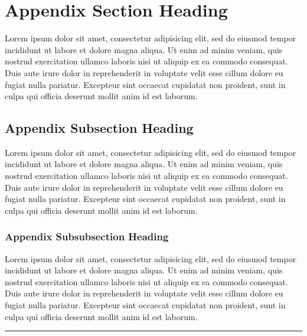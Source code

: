 \documentclass[11pt]{penrose}
\begin{document}
\appendix


\section{Appendix Section Heading}
Lorem ipsum dolor sit amet, consectetur adipisicing elit, sed do eiusmod tempor incididunt ut labore et dolore magna aliqua. Ut enim ad minim veniam, quis nostrud exercitation ullamco laboris nisi ut aliquip ex ea commodo consequat. Duis aute irure dolor in reprehenderit in voluptate velit esse cillum dolore eu fugiat nulla pariatur. Excepteur sint occaecat cupidatat non proident, sunt in culpa qui officia deserunt mollit anim id est laborum.

\subsection{Appendix Subsection Heading}
Lorem ipsum dolor sit amet, consectetur adipisicing elit, sed do eiusmod tempor incididunt ut labore et dolore magna aliqua. Ut enim ad minim veniam, quis nostrud exercitation ullamco laboris nisi ut aliquip ex ea commodo consequat. Duis aute irure dolor in reprehenderit in voluptate velit esse cillum dolore eu fugiat nulla pariatur. Excepteur sint occaecat cupidatat non proident, sunt in culpa qui officia deserunt mollit anim id est laborum.

  \subsubsection{Appendix Subsubsection Heading}
  Lorem ipsum dolor sit amet, consectetur adipisicing elit, sed do eiusmod tempor incididunt ut labore et dolore magna aliqua. Ut enim ad minim veniam, quis nostrud exercitation ullamco laboris nisi ut aliquip ex ea commodo consequat. Duis aute irure dolor in reprehenderit in voluptate velit esse cillum dolore eu fugiat nulla pariatur. Excepteur sint occaecat cupidatat non proident, sunt in culpa qui officia deserunt mollit anim id est laborum.

\begin{center}
  \vspace*{0.5em}
  \rule{0.8\textwidth}{0.8pt}
\end{center}

\nocite{*}
{\small }
\end{document}
